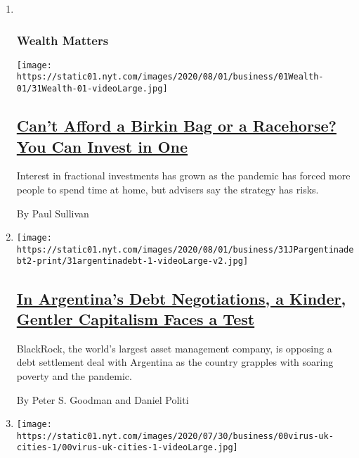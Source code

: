 \begin{enumerate}
\def\labelenumi{\arabic{enumi}.}
\item ~
  \hypertarget{wealth-matters}{%
  \subsubsection{Wealth Matters}\label{wealth-matters}}

  \texttt{[image: https://static01.nyt.com/images/2020/08/01/business/01Wealth-01/31Wealth-01-videoLarge.jpg]}

  \hypertarget{cant-afford-a-birkin-bag-or-a-racehorse-you-can-invest-in-one}{%
  \subsection{\texorpdfstring{\href{/2020/07/31/your-money/birkin-bag-racehorse-invest.html}{Can't
  Afford a Birkin Bag or a Racehorse? You Can Invest in
  One}}{Can't Afford a Birkin Bag or a Racehorse? You Can Invest in One}}\label{cant-afford-a-birkin-bag-or-a-racehorse-you-can-invest-in-one}}

  Interest in fractional investments has grown as the pandemic has
  forced more people to spend time at home, but advisers say the
  strategy has risks.

  By Paul Sullivan
\item
  \texttt{[image: https://static01.nyt.com/images/2020/08/01/business/31JPargentinadebt2-print/31argentinadebt-1-videoLarge-v2.jpg]}

  \hypertarget{in-argentinas-debt-negotiations-a-kinder-gentler-capitalism-faces-a-test}{%
  \subsection{\texorpdfstring{\href{/2020/07/31/business/argentina-debt.html}{In
  Argentina's Debt Negotiations, a Kinder, Gentler Capitalism Faces a
  Test}}{In Argentina's Debt Negotiations, a Kinder, Gentler Capitalism Faces a Test}}\label{in-argentinas-debt-negotiations-a-kinder-gentler-capitalism-faces-a-test}}

  BlackRock, the world's largest asset management company, is opposing a
  debt settlement deal with Argentina as the country grapples with
  soaring poverty and the pandemic.

  By Peter S. Goodman and Daniel Politi
\item
  \texttt{[image: https://static01.nyt.com/images/2020/07/30/business/00virus-uk-cities-1/00virus-uk-cities-1-videoLarge.jpg]}


\end{enumerate}

